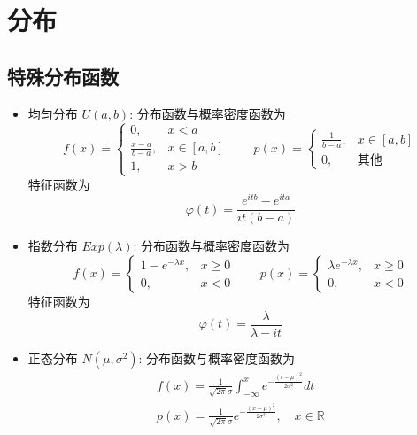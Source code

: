 \section{分布}


\subsection{特殊分布函数}

\begin{itemize}
    \item 均匀分布 $U(a,b)$: 分布函数与概率密度函数为
          $$f(x)=\begin{cases}
                  0,               & x<a       \\
                  \frac{x-a}{b-a}, & x\in[a,b] \\
                  1,               & x>b
              \end{cases} \qquad p(x)=\begin{cases}
                  \frac{1}{b-a}, & x\in[a,b] \\
                  0,             & \text{其他}
              \end{cases}$$
          特征函数为
          $$\varphi(t) = \frac{e^{itb} - e^{ita}}{it(b-a)}$$
    \item 指数分布 $Exp(\lambda)$: 分布函数与概率密度函数为
          $$f(x)=\begin{cases}
                  1-e^{-\lambda x}, & x\geq 0 \\
                  0,                & x<0
              \end{cases} \qquad p(x)=\begin{cases}
                  \lambda e^{-\lambda x}, & x\geq 0 \\
                  0,                      & x<0
              \end{cases}$$
          特征函数为
          $$\varphi(t) = \frac{\lambda}{\lambda - it}$$
    \item 正态分布 $N(\mu,\sigma^2)$: 分布函数与概率密度函数为
          \begin{gather*}
              f(x)=\frac{1}{\sqrt{2\pi}\sigma}\int_{-\infty}^x e^{-\frac{(t-\mu)^2}{2\sigma^2}}dt \\
              p(x)=\frac{1}{\sqrt{2\pi}\sigma}e^{-\frac{(x-\mu)^2}{2\sigma^2}}, \quad x\in\mathbb{R}

\end{gather*}
\end{itemize}
